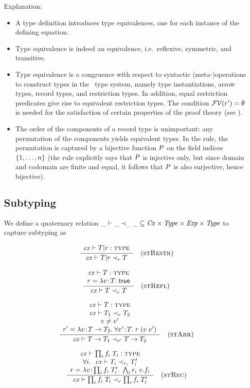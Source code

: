 Explanation:
\begin{itemize}
\item
A type definition introduces type equivalences, one for each instance of the
defining equation.
\item
Type equivalence is indeed an equivalence, i.e.\ reflexive, symmetric, and
transitive.
\item
Type equivalence is a congruence with respect to syntactic (meta-)operations
to construct types in the \MS\ type system, namely type instantiations, arrow
types, record types, and restriction types. In addition, equal restriction
predicates give rise to equivalent restriction types. The condition
$\mathcal{FV}(r')=\emptyset$ is needed for the satisfaction of certain
properties of the proof theory (see ).
\item
The order of the components of a record type is unimportant: any permutation
of the components yields equivalent types. In the rule, the permutation is
captured by a bijective function $P$ on the field indices $\{1,\ldots,n\}$
(the rule explicitly says that $P$ is injective only, but since domain and
codomain are finite and equal, it follows that $P$ is also surjective,
hence bijective).
\end{itemize}

\subsection{Subtyping}

We define a quaternary relation $\_\vdash\_\prec_{\_}\_\subseteq\mathit{Cx}\times\mathit{Type}\times\mathit{Exp}\times\mathit{Type}$ to
capture subtyping as

\[
\frac{\begin{array}{c}\mathit{cx}\vdash T|r:\textsc{type}\end{array}}{\mathit{cx}\vdash T|r\prec_{r}T}\quad\mbox{(\textsc{stRestr})}
\]

\[
\frac{\begin{array}{c}\mathit{cx}\vdash T:\textsc{type}\\r=\lambda v\!:\!T.\;\mathsf{true}\end{array}}{\mathit{cx}\vdash T\prec_{r}T}\quad\mbox{(\textsc{stRefl})}
\]

\[
\frac{\begin{array}{c}\mathit{cx}\vdash T:\textsc{type}\\\mathit{cx}\vdash T_1\prec_{r}T_2\\v\neq v'\\r'=\lambda v\!:\!T\to T_2.\;\forall v'\!:\!T.\;r\;(v\;v')\end{array}}{\mathit{cx}\vdash T\to T_1\prec_{r'}T\to T_2}\quad\mbox{(\textsc{stArr})}
\]

\[
\frac{\begin{array}{c}\mathit{cx}\vdash\prod_{i}f_i\;T_i:\textsc{type}\\\forall i.\ \ \mathit{cx}\vdash T_i\prec_{r_i}T_i'\\r=\lambda v\!:\!\prod_{i}f_i\;T_i'.\;\bigwedge_{i}r_i\;v.f_i\end{array}}{\mathit{cx}\vdash\prod_{i}f_i\;T_i\prec_{r}\prod_{i}f_i\;T_i'}\quad\mbox{(\textsc{stRec})}
\]

